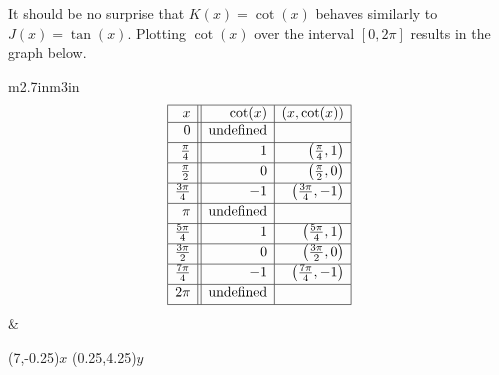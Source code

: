 \smallskip

It should be no surprise that $K(x) = \cot(x)$ behaves similarly to $J(x) = \tan(x)$. Plotting $\cot(x)$ over the interval $[0,2\pi]$ results in the graph below. 

\hspace{.5in} \begin{tabular}{m{2.7in}m{3in}}
\setlength{\extrarowheight}{2pt}
\[ \begin{array}{|r||r|r|}  

\hline

 x & \cot(x) & (x,\cot(x)) \\ \hline
0  & \text{undefined} &  \\ [2pt]   \hline
\frac{\pi}{4}  & 1 & \left(\frac{\pi}{4},1 \right) \\ [2pt] \hline 
\frac{\pi}{2}  & 0 & \left(\frac{\pi}{2},0 \right)  \\ [2pt] \hline 
\frac{3\pi}{4}  & -1 & \left(\frac{3\pi}{4}, -1\right) \\ [2pt] \hline 
\pi & \text{undefined} &  \\ [2pt] \hline 
\frac{5\pi}{4}  & 1 & \left(\frac{5\pi}{4}, 1 \right) \\ [2pt] \hline 
\frac{3\pi}{2}  & 0 & \left(\frac{3\pi}{2}, 0 \right) \\ [2pt] \hline 
\frac{7\pi}{4}  & -1 & \left(\frac{7\pi}{4}, -1 \right) \\ [2pt] \hline 
2\pi  & \text{undefined} &  \\  [2pt] \hline
\end{array} \] \setlength{\extrarowheight}{0pt} &

\begin{mfpic}[25]{-1}{7}{-4}{4.25}
\dashed {}
\dashed {}
\axes
\tlabel[cc](7,-0.25){\scriptsize $x$}
\tlabel[cc](0.25,4.25){\scriptsize $y$}
\tlpointsep{4pt}
\scriptsize
{}
\normalsize
\arrow \reverse \arrow {}
\arrow \reverse \arrow {}
\end{mfpic} \\

\end{tabular}

